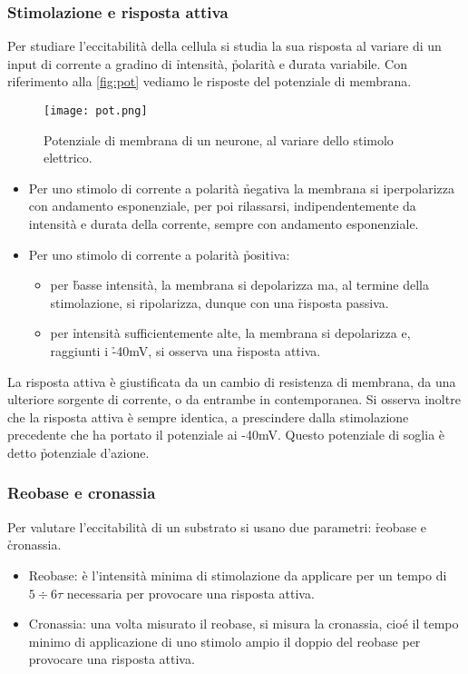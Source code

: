 \subsubsection{Stimolazione e risposta attiva}
Per studiare l'eccitabilità della cellula si studia la sua risposta al variare di un input di corrente a gradino di \h{intensità}, \h{polarità} e \h{durata} variabile. Con riferimento alla \autoref{fig:pot} vediamo le risposte del potenziale di membrana.

\begin{figure}[h]
    \centering
    \texttt{[image: pot.png]}
    \caption{Potenziale di membrana di un neurone, al variare dello stimolo elettrico.}
    \label{fig:pot}
\end{figure}

\begin{itemize}
    \item Per uno stimolo di corrente a polarità \h{negativa} la membrana si iperpolarizza con andamento esponenziale, per poi rilassarsi, indipendentemente da intensità e durata della corrente, sempre con andamento esponenziale.
    \item Per uno stimolo di corrente a polarità \h{positiva}:
    \begin{itemize}
        \item per \h{basse intensità}, la membrana si depolarizza ma, al termine della stimolazione, si ripolarizza, dunque con una \h{risposta passiva}.
        \item per \h{intensità sufficientemente alte}, la membrana si depolarizza e, raggiunti i \h{-40mV}, si osserva una \h{risposta attiva}.
    \end{itemize}
\end{itemize}

La risposta attiva è giustificata da un cambio di resistenza di membrana, da una ulteriore sorgente di corrente, o da entrambe in contemporanea. Si osserva inoltre che la risposta attiva è sempre identica, a prescindere dalla stimolazione precedente che ha portato il potenziale ai -40mV. Questo potenziale di soglia è detto \h{potenziale d'azione}.

\subsubsection{Reobase e cronassia}
Per valutare l'eccitabilità di un substrato si usano due parametri: \h{reobase} e \h{cronassia}.
\begin{itemize}
    \item Reobase: è l'intensità minima di stimolazione da applicare per un tempo di $5\div6\tau$ necessaria per provocare una risposta attiva.
    \item Cronassia: una volta misurato il reobase, si misura la cronassia, cioé il tempo minimo di applicazione di uno stimolo ampio il doppio del reobase per provocare una risposta attiva.
\end{itemize}

